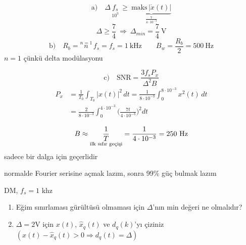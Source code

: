 \documentclass[11pt,a4paper]{article}
\begin{document}
\[ \text{a)}\quad \Delta\,\underset{10^3}{f_s}\ \ge\ \underbrace{\mathrm{maks}\,|\dot{x}(t)|}_{\frac{7}{4\cdot10^{-3}}} \]
\[ \Delta \ge \frac{7}{4}\ \Rightarrow\ \Delta_{min}=\frac{7}{4}\ \mathrm{V} \]
\[ \text{b)}\quad R_b=\overset{n=1}{n}\,f_s=f_s=1\ \text{kHz} \qquad B_w=\frac{R_b}{2}=500\ \text{Hz} \]
$n=1$ çünkü delta modülasyonu

\[ \text{c)}\quad \mathrm{SNR}=\frac{3f_sP_x}{\Delta^2B} \]
\begin{align*}
P_x &= \frac{1}{T_0}\int_{T_0}|x(t)|^2\,dt=\frac{1}{8\cdot10^{-3}}\int_0^{8\cdot10^{-3}}x^2(t)\,dt\\
&=\frac{2}{8\cdot10^{-3}}\int_0^{4\cdot10^{-3}}\Big(\frac{7t}{4\cdot10^{-3}}\Big)^2dt
\end{align*}

\begin{center}
\end{center}
\[ B\approx\underset{\text{\scriptsize ilk sıfır geçişi}}{\frac{1}{T}}=\frac{1}{4\cdot10^{-3}}=250\ \text{Hz} \]
sadece bir dalga için geçerlidir

normalde Fourier serisine açmak lazım, sonra 99\% güç bulmak lazım

\begin{ornek}
DM, $f_s=1$ khz
\begin{enumerate}[label=\alph*)]
\item Eğim sınırlaması gürültüsü olmaması için $\Delta$'nın min değeri ne olmalıdır?
\item $\Delta=2$V için $x(t)$, $\hat{x}_q(t)$ ve $d_q(k)$'yı çiziniz \\ $(x(t)-\hat{x}_q(t)>0 \Rightarrow d_q(t)=\Delta)$
\end{enumerate}
\end{ornek}

\begin{center}
\end{center}
\end{document}
